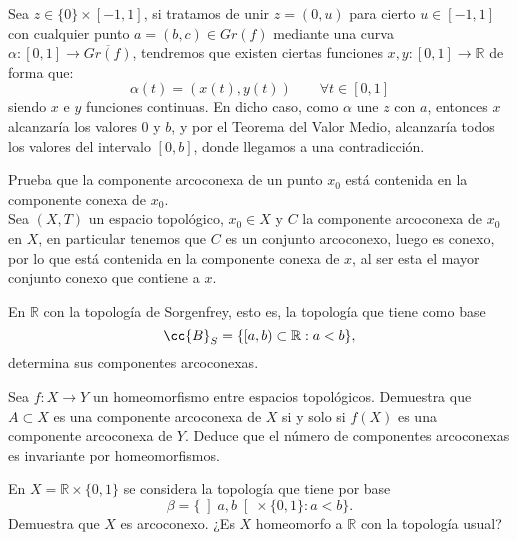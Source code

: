 \begin{ejercicio}
   Sea $z\in \{0\}\times [-1,1]$, si tratamos de unir $z=(0,u)$ para cierto $u\in [-1,1]$ con cualquier punto $a=(b,c)\in Gr(f)$ mediante una curva $\alpha:[0,1]\to \overline{Gr(f)}$, tendremos que existen ciertas funciones $x,y:[0,1]\to \mathbb{R}$ de forma que:
   \begin{equation*}
       \alpha(t) = (x(t), y(t)) \qquad \forall t\in [0,1]
   \end{equation*}
   siendo $x$ e $y$ funciones continuas. En dicho caso, como $\alpha$ une $z$ con $a$, entonces $x$ alcanzaría los valores $0$ y $b$, y por el Teorema del Valor Medio, alcanzaría todos los valores del intervalo $[0,b]$, donde llegamos a una contradicción.
\end{ejercicio}

\begin{ejercicio}
    Prueba que la componente arcoconexa de un punto $x_0$ está contenida en la componente conexa de $x_0$.\\

    \noindent
    Sea $(X,T)$ un espacio topológico, $x_0\in X$ y $C$ la componente arcoconexa de $x_0$ en $X$, en particular tenemos que $C$ es un conjunto arcoconexo, luego es conexo, por lo que está contenida en la componente conexa de $x$, al ser esta el mayor conjunto conexo que contiene a $x$.
\end{ejercicio}

\begin{ejercicio}
    En $\mathbb{R}$ con la topología de Sorgenfrey, esto es, la topología que tiene como base
    \begin{equation*}
        \cc{B}_S = \{[a,b) \subset \mathbb{R} : a<b\},
    \end{equation*}
    determina sus componentes arcoconexas.
\end{ejercicio}

\begin{ejercicio}
    Sea $f:X\to Y$ un homeomorfismo entre espacios topológicos. Demuestra que $A\subset X$ es una componente arcoconexa de $X$ si y solo si $f(X)$ es una componente arcoconexa de $Y$. Deduce que el número de componentes arcoconexas es invariante por homeomorfismos.
\end{ejercicio}

\begin{ejercicio}
    En $X=\mathbb{R}\times \{0,1\}$ se considera la topología que tiene por base
    \begin{equation*}
        \beta = \{\left]a,b\right[\times \{0,1\} : a<b\}.
    \end{equation*}
    Demuestra que $X$ es arcoconexo. ¿Es $X$ homeomorfo a $\mathbb{R}$ con la topología usual?
\end{ejercicio}

